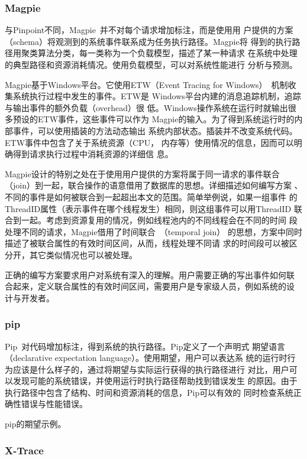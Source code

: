 \subsubsection*{Magpie}

与Pinpoint不同，Magpie~\cite{magpie}并不对每个请求增加标注，而是使用用
户提供的方案（schema）将观测到的系统事件联系成为任务执行路径。Magpie将
得到的执行路径用聚类算法分类，每一类称为一个负载模型，描述了某一种请求
在系统中处理的典型路径和资源消耗情况。使用负载模型，可以对系统性能进行
分析与预测。

Magpie基于Windows平台。它使用ETW（Event Tracing for
Windows）~\cite{etw, Park2003}机制收集系统执行过程中发生的事件。ETW是
Windows平台内建的消息追踪机制，追踪与输出事件的额外负载（overhead）很
低。Windows操作系统在运行时就输出很多预设的ETW事件，这些事件可以作为
Magpie的输入。为了得到系统运行时的内部事件，可以使用插装的方法动态输出
系统内部状态。插装并不改变系统代码。ETW事件中包含了关于系统资源（CPU，
内存等）使用情况的信息，因而可以明确得到请求执行过程中消耗资源的详细信
息。

Magpie设计的特别之处在于使用用户提供的方案将属于同一请求的事件联合
（join）到一起，联合操作的语意借用了数据库的思想。详细描述如何编写方案
、不同的事件是如何被联合到一起超出本文的范围。简单举例说，如果一组事件
的ThreadID属性（表示事件在哪个线程发生）相同，则这组事件可以用ThreadID
联合到一起。考虑到资源复用的情况，例如线程池内的不同线程会在不同的时间
段处理不同的请求，Magpie借用了时间联合~\cite{Gao2005}（temporal join）
的思想，方案中同时描述了被联合属性的有效时间区间，从而，线程处理不同请
求的时间段可以被区分开，其它类似情况也可以被处理。

正确的编写方案要求用户对系统有深入的理解。用户需要正确的写出事件如何联
合起来，定义联合属性的有效时间区间，需要用户是专家级人员，例如系统的设
计与开发者。

\subsubsection*{pip}

Pip~\cite{pip}对代码增加标注，得到系统的执行路径。Pip定义了一个声明式
期望语言（declarative expectation language）。使用期望，用户可以表达系
统的运行时行为应该是什么样子的，通过将期望与实际运行获得的执行路径进行
对比，用户可以发现可能的系统错误，并使用运行时执行路径帮助找到错误发生
的原因。由于执行路径中包含了结构、时间和资源消耗的信息，Pip可以有效的
同时检查系统正确性错误与性能错误。

pip的期望示例。

\subsubsection*{X-Trace}

